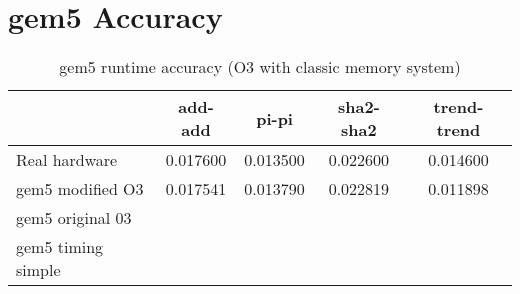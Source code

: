 \section{gem5 Accuracy}



\begin{table}
\centering
\begin{tabular}{|l|c|c|c|c|}
\hline
 & add-add & pi-pi & sha2-sha2 & trend-trend \\
\hline
Real hardware & 0.017600  & 0.013500 & 0.022600 & 0.014600 \\
gem5 modified O3    & 0.017541  & 0.013790 & 0.022819 & 0.011898 \\
gem5 original 03    & & & & \\
gem5 timing simple & & & & \\
\hline
\end{tabular}
\caption{gem5 runtime accuracy (O3 with classic memory system)}
\label{tbl:gem5runtimeaccuracy}
\end{table}
